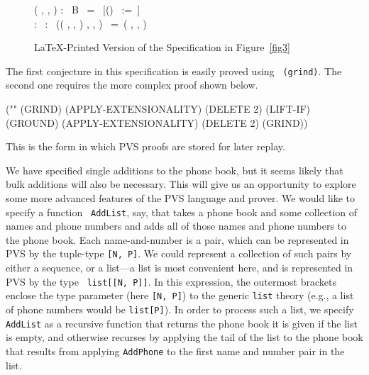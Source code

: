 \begin{figure}
\begin{program}
 (\ii {} ,  , ) :\mbox{ } B \mbox{ }=\mbox{ }  [\ii(\ii {}) \mbox{ }:=\mbox{ }\ii {}] \pvsnewline{}
\\[-\baselineskip]\oo\oo\oo\oo\zi\zi\zi\zo\zo\zo \pvsnewline{}
  :\mbox{ }   \pvsnewline{}
 \pvsnewline{}
  :\mbox{ }  \pvsnewline{}
\zi\zi {}(\ii {}(\ii {} ,  , ) ,  , ) \mbox{ }=\mbox{ }\ii {}(\ii {} ,  , ) \pvsnewline{}
\\[-\baselineskip]\oo\oo\oo\oo\zi\zi\zo\zi\zo\zo\zo\zo \pvsnewline{}
   \pvsnewline{}
\zo \end{program}
\caption{\label{fig3-latex}\LaTeX-Printed Version of the Specification
in Figure~\protect\ref{fig3}}
\end{figure}
The first conjecture in this specification is easily proved using {\tt
(grind)}.   The second one requires the more complex proof shown
below.
\begin{jmrsession}
("" (GRIND)
    (APPLY-EXTENSIONALITY)
    (DELETE 2)
    (LIFT-IF)
    (GROUND)
    (APPLY-EXTENSIONALITY)
    (DELETE 2)
    (GRIND))
\end{jmrsession}
This is the form in which PVS proofs are stored for later replay.

We have specified single additions to the phone book, but it seems
likely that bulk additions will also be necessary.  This will give us
an opportunity to explore some more advanced features of the PVS
language and prover.  We would like to specify a function {\tt
AddList}, say, that takes a phone book and some collection of names
and phone numbers and adds all of those names and phone numbers to the
phone book.  Each name-and-number is a pair, which can be represented
in PVS by the tuple-type {\tt [N, P]}.  We could represent a
collection of such pairs by either a sequence, or a list---a list is
most convenient here, and is represented in PVS by the type {\tt
list[[N, P]]}.  In this expression, the outermost brackets enclose the
type parameter (here {\tt [N, P]}) to the generic {\tt list} theory
(e.g., a list of phone numbers would be {\tt list[P]}).  In order to
process such a list, we specify {\tt AddList} as a recursive function
that returns the phone book it is given if the list is empty, and
otherwise recurses by applying the tail of the list to the phone book
that results from applying {\tt AddPhone} to the first name and number
pair in the list.

